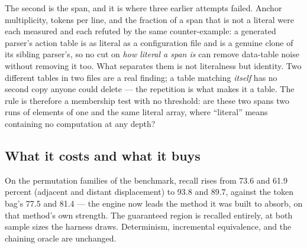\documentclass[10pt,a4paper]{article}
\newcounter{lem}[section]
\begin{document}
The second is the span, and it is where three earlier attempts failed. Anchor multiplicity, tokens
per line, and the fraction of a span that is not a literal were each measured and each refuted by
the same counter-example: a generated parser's action table is as literal as a configuration file
and is a genuine clone of its sibling parser's, so no cut on \emph{how literal a span is} can
remove data-table noise without removing it too. What separates them is not literalness but
identity. Two different tables in two files are a real finding; a table matching \emph{itself} has
no second copy anyone could delete --- the repetition is what makes it a table. The rule is
therefore a membership test with no threshold: are these two spans two runs of elements of one and
the same literal array, where ``literal'' means containing no computation at any depth?

\subsection{What it costs and what it buys}
On the permutation families of the benchmark, recall rises from 73.6 and 61.9 percent (adjacent
and distant displacement) to 93.8 and 89.7, against the token bag's 77.5 and 81.4 --- the engine
now leads the method it was built to absorb, on that method's own strength. The guaranteed region
is recalled entirely, at both sample sizes the harness draws. Determinism, incremental equivalence, and the chaining oracle are unchanged.
\end{document}
